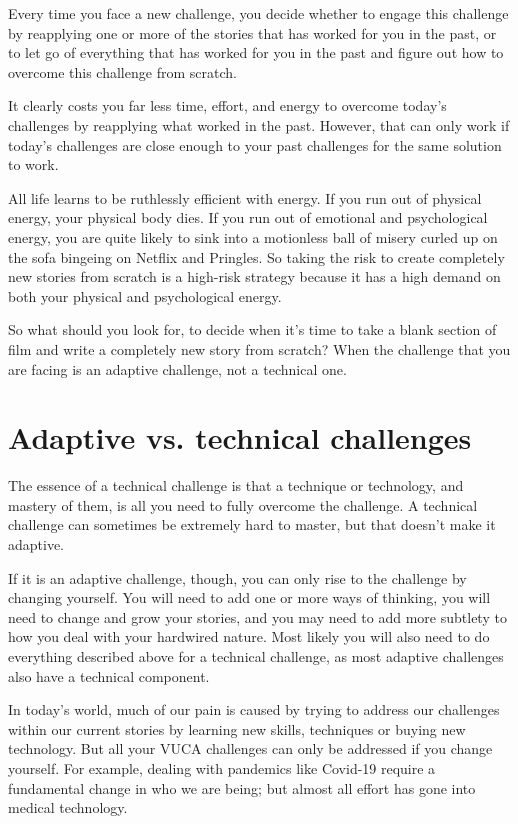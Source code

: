 Every time you face a new challenge, you decide whether to engage this challenge by reapplying one or more of the stories that has worked for you in the past, or to let go of everything that has worked for you in the past and figure out how to overcome this challenge from scratch.


It clearly costs you far less time, effort, and energy to overcome today's challenges by reapplying what worked in the past. However, that can only work if today's challenges are close enough to your past challenges for the same solution to work.


All life learns to be ruthlessly efficient with energy. If you run out of physical energy, your physical body dies. If you run out of emotional and psychological energy, you are quite likely to sink into a motionless ball of misery curled up on the sofa bingeing on Netflix and Pringles. So taking the risk to create completely new stories from scratch is a high-risk strategy because it has a high demand on both your physical and psychological energy.


So what should you look for, to decide when it's time to take a blank section of film and write a completely new story from scratch? When the challenge that you are facing is an adaptive challenge, not a technical one.
\section{Adaptive vs. technical challenges}
\label{section:adaptive-technical}


The essence of a technical challenge is that a technique or technology, and mastery of them, is all you need to fully overcome the challenge. A technical challenge can sometimes be extremely hard to master, but that doesn't make it adaptive.


If it is an adaptive challenge, though, you can only rise to the challenge by changing yourself. You will need to add one or more ways of thinking, you will need to change and grow your stories, and you may need to add more subtlety to how you deal with your hardwired nature. Most likely you will also need to do everything described above for a technical challenge, as most adaptive challenges also have a technical component.


In today's world, much of our pain is caused by trying to address our challenges within our current stories by learning new skills, techniques or buying new technology. But all your VUCA  challenges can only be addressed if you change yourself. For example, dealing with pandemics like Covid-19  require a fundamental change in who we are being; but almost all effort has gone into medical technology.


